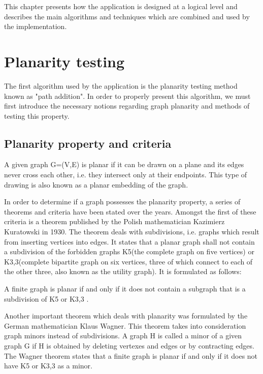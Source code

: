 This chapter presents how the application is designed at a logical level and describes the 
main algorithms and techniques which are combined and used by the implementation.

\section{Planarity testing}

The first algorithm used by the application is the planarity testing method known as "path addition". In 
order to properly present this algorithm, we must first introduce the necessary notions regarding graph planarity 
and methods of testing this property.

\subsection{Planarity property and criteria}

A given graph G=(V,E) is planar if it can be drawn on a plane and its edges never cross each other, i.e. they 
intersect only at their endpoints. This type of drawing is also known as a planar embedding of the graph.

In order to determine if a graph possesses the planarity property, a series of theorems and criteria have been 
stated over the years. Amongst the first of these criteria is a theorem published by the Polish mathematician 
Kazimierz Kuratowski in 1930. The theorem deals with subdivisions, i.e. graphs which result from inserting vertices 
into edges. It states that a planar graph shall not contain a subdivision of the forbidden graphs K5(the complete 
graph on five vertices) or K3,3(complete bipartite graph on six vertices, three of which connect to each of the other 
three, also known as the utility graph). It is formulated as follows:

A finite graph is planar if and only if it does not contain a subgraph that is a subdivision of K5 or K3,3 .

Another important theorem which deals with planarity was formulated by the German mathematician Klaus Wagner. 
This theorem takes into consideration graph minors instead of subdivisions. A graph H is called a minor of a given 
graph G if H is obtained by deleting vertexes and edges or by contracting edges. The Wagner theorem states that 
a finite graph is planar if and only if it does not have K5 or K3,3 as a minor.

